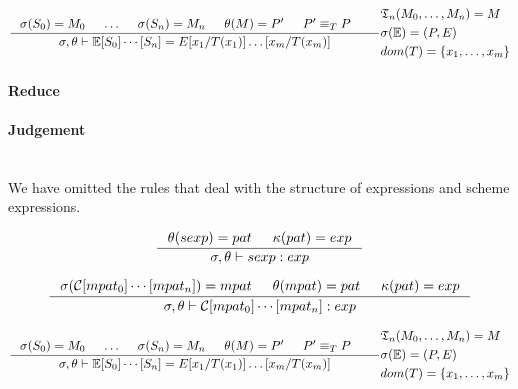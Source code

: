 \[
\inference
{
  \sigma(S_0) = M_0 & \ldots & \sigma(S_n) = M_n &
  \theta(M) = P' & P' \equiv_T P &
}
{
  \sigma, \theta |- \mathbb{E}[S_0]\cdots[S_n] = E[x_1/T(x_1)]\ldots[x_m/T(x_m)]
}
{
  \begin{aligned}
    & \mathfrak{T}_n(M_0, \ldots, M_n) = M\\
    & \sigma(\mathbb{E}) = (P, E)\\
    & dom(T) = \{x_1, \ldots, x_m\}
  \end{aligned}
}
\]




\paragraph{Reduce}

\paragraph{Judgement} \\

We have omitted the rules that deal with the structure of expressions and scheme
expressions.



\[
\inference
{
  \theta(sexp) = pat & \kappa(pat) = exp
}
{
  \sigma, \theta |- sexp : exp
}
\]

\[
\inference
{
  \sigma(\mathcal{C}[mpat_0]\cdots[mpat_n]) = mpat & \theta(mpat) = pat & \kappa(pat) = exp
}
{
  \sigma, \theta |- \mathcal{C}[mpat_0]\cdots[mpat_n] : exp
}
\]


\[
\inference
{
  \sigma(S_0) = M_0 & \ldots & \sigma(S_n) = M_n &
  \theta(M) = P' & P' \equiv_T P &
}
{
  \sigma, \theta |- \mathbb{E}[S_0]\cdots[S_n] = E[x_1/T(x_1)]\ldots[x_m/T(x_m)]
}
{
  \begin{aligned}
    & \mathfrak{T}_n(M_0, \ldots, M_n) = M\\
    & \sigma(\mathbb{E}) = (P, E)\\
    & dom(T) = \{x_1, \ldots, x_m\}
  \end{aligned}
}
\]

